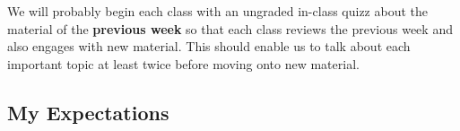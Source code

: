 \documentclass[11pt,letterpaper]{article}
\begin{document}
    We will probably begin each class with an ungraded in-class quizz about the
    material of the \textbf{previous week} so that each class reviews the
    previous week and also engages with new material. This should enable us to
    talk about each important topic at least twice before moving onto new
    material.



    \subsection*{My Expectations}
\end{document}
